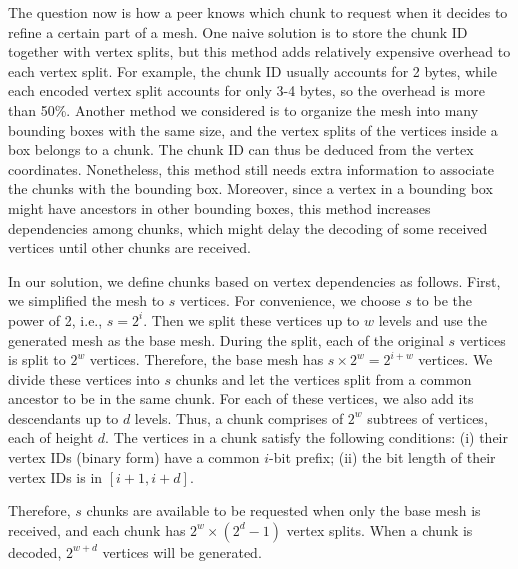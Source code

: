     The question now is how a peer knows which chunk to request
    when it decides to refine a certain part of a mesh.  
    One naive solution is to store the chunk ID together with vertex
    splits,
    but this method adds %
    relatively expensive overhead to each vertex split. For example, the
    chunk ID usually accounts for 2 bytes, while each encoded vertex
    split accounts for only 3-4 bytes, so the overhead is more than 50\%.
    Another method we considered is to organize the mesh into
    many bounding boxes with the same size, and the vertex splits of the
    vertices inside a box belongs to a chunk. 
    The chunk ID can thus be deduced from the vertex coordinates.
    Nonetheless, this method still needs extra information to
    associate the chunks with the bounding box. %
    Moreover, since a
    vertex in a bounding box might have ancestors in other bounding
    boxes, this method increases dependencies among chunks, which might
    delay the decoding of some received vertices until other chunks are received.

    In our solution, we define chunks based on vertex dependencies as follows.
    First, we simplified the mesh to $s$ vertices. 
    For convenience, we choose $s$ to be the power of 2, i.e., $s = 2^i$.
    Then we split these vertices up to $w$ levels and use the 
    generated mesh as the base mesh. During the split, each of the
    original $s$ vertices is split to $2^w$ vertices. 
    Therefore, the base mesh has 
    $s \times 2^{w}  = 2^{i+w}$
    vertices. 
    We divide these vertices into $s$ chunks and let the vertices
    split from a common ancestor to be in the same chunk.
    For each of these vertices, we also add its descendants up
    to $d$ levels.  Thus, a chunk comprises of $2^w$ subtrees of
    vertices, each of height $d$.
    The vertices in a chunk satisfy the following
    conditions: (i) their vertex IDs (binary form) have a common
    $i$-bit prefix; (ii) the bit length of their vertex IDs is in $[i+1, i+d]$. 

    Therefore,  
    $s$ chunks are available to be requested when only the base mesh is received, 
    and each chunk has
    $2^{w} \times (2^{d} - 1)$
    vertex splits.
    When a chunk is decoded,  $2^{w+d}$
    vertices will be generated. 
    
